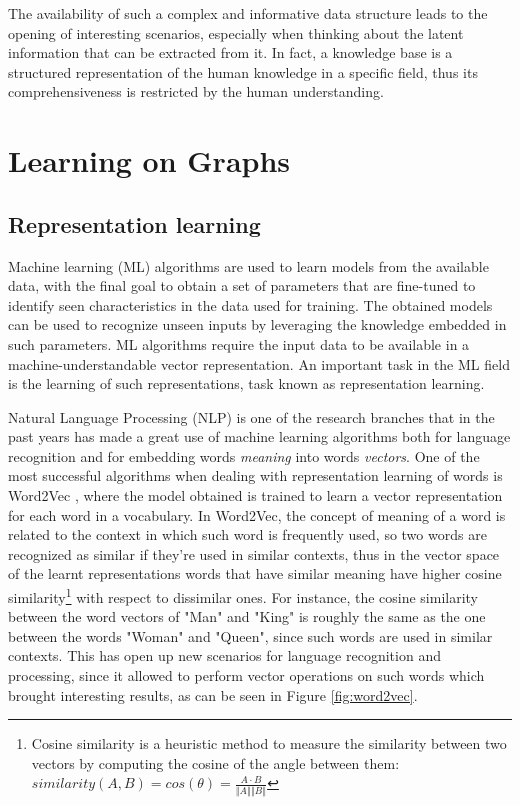 \documentclass[%
    corpo=13.5pt,
    twoside,
    oldstyle,
    tipotesi=magistrale,
    greek,
    evenboxes
]{toptesi}
\begin{document}
The availability of such a complex and informative data structure leads
to the opening of interesting scenarios, especially when thinking about
the latent information that can be extracted from it. In
fact, a knowledge base is a structured representation of the
human knowledge in a specific field, thus its comprehensiveness is restricted
by the human understanding.


\section{Learning on Graphs}

\subsection{Representation learning}

Machine learning (ML) algorithms are used to learn models from the
available data, with the final goal to obtain a set of parameters
that are fine-tuned to identify seen characteristics in the data
used for training. The obtained models can be used to
recognize unseen inputs by leveraging the knowledge embedded
in such parameters.
ML algorithms require the input data to be available in a
machine-understandable vector representation. An important task
in the ML field is the learning of such representations, task known
as representation learning.

Natural Language Processing (NLP) is one of the research branches that in
the past years has made a great use of machine learning algorithms both for
language recognition and for embedding words \emph{meaning} into words
\emph{vectors}.
One of the most successful algorithms when dealing with representation learning
of words is Word2Vec \cite{mikolov2013}, where the model obtained is trained to
learn a vector representation for each word in a vocabulary.
In Word2Vec, the concept of meaning of a word is related to the context in
which such word is frequently used, so two words are recognized as similar if
they're used in similar contexts, thus in the vector space of the learnt
representations words that have similar meaning have higher
cosine similarity\footnote{
    Cosine similarity is a heuristic method to measure the
    similarity between two vectors by computing the cosine of the angle between
    them:
    $similarity(A,B) = cos(\theta) = \frac{A \cdot B}{\Vert A \Vert \Vert B \Vert}$
}
with respect to dissimilar ones.
For instance, the cosine similarity between the word vectors of "Man" and "King"
is roughly the same as the one between the words "Woman" and "Queen", since such
words are used in similar contexts. This has open up new scenarios for
language recognition and processing, since it allowed to perform vector
operations on such words which brought interesting results, as can be seen
in Figure \ref{fig:word2vec}.
\end{document}
